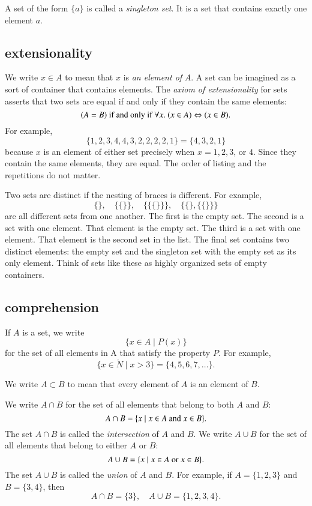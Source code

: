\documentclass[cup9a]{cupbook}
\begin{document}
A set of the form $\{a\}$ is called a {\it singleton set}.  It is a set that contains exactly one element $a$.

\subsection{extensionality}

We write $x\in A$ to mean that $x$ is {\it an element of} $A$.  A set can be imagined as a sort of container that contains elements.  The {\it axiom of extensionality} for sets asserts that two sets are equal if and only if they contain the same elements:
   $$(A = B)\hbox{ if and only if } \forall x.\ (x\in A) \Leftrightarrow (x\in B).$$
For example,
   $$\{1,2,3,4,4,3,2,2,2,2,1\} = \{4,3,2,1\}$$
because $x$ is an element of either set precisely when $x=1,2,3$, or $4$.
Since they contain the same elements, they are equal.  The order of listing and the repetitions do not matter.

Two sets are distinct if the nesting of braces is different.
For example,
$$
\{\},\quad \{\{\}\},\quad \{\{\{\}\}\},\quad \{\{\},\{\{\}\}\}
$$
are all different sets from one another.  The first is the empty set.
The second is a set with one element.  That element is the empty set.
The third is a set with one element.  That element is the second set in the list.  The final set contains two distinct elements: the empty set and the singleton set with the empty set as its only element.  Think of sets like these as highly organized sets of empty containers.

\subsection{comprehension}

If $A$ is a set, we write
$$
\{x \in A \mid P(x)\}
$$
for the set of all elements in A that satisfy the property $P$.
For example,
$$
\{x\in\ring{N} \mid x > 3\} = \{4,5,6,7,\ldots\}.
$$



We write $A\subset B$ to mean that every element of $A$ is an element of $B$.

We write $A\cap B$ for the set of all elements that belong to both $A$ and $B$:
$$
A\cap B = \{x \mid x\in A\hbox{ and } x \in B\}.
$$
The set $A\cap B$ is called the {\it intersection} of $A$ and $B$.
We write $A\cup B$ for the set of all elements that belong to either $A$ or $B$:
$$
A\cup B = \{x\mid x\in A\hbox{ or } x\in B\}.
$$
The set $A\cup B$ is called the {\it union} of $A$ and $B$.
For example, if $A=\{1,2,3\}$ and $B = \{3,4\}$, then
$$
A\cap B = \{3\},\quad A\cup B = \{1,2,3,4\}.
$$
\end{document}
